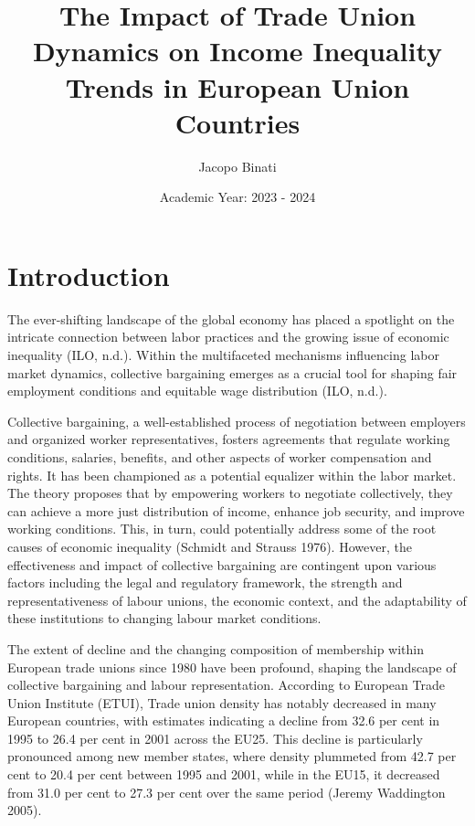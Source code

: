 \documentclass{article}
\begin{document}
\title{The Impact of Trade Union Dynamics on Income Inequality Trends in European Union Countries}
\author{Jacopo Binati}
\date{Academic Year: 2023 - 2024}
\maketitle
\section{Introduction}

The ever-shifting landscape of the global economy has placed a spotlight on the intricate connection between labor practices and the growing issue of economic inequality (ILO, n.d.). Within the multifaceted mechanisms influencing labor market dynamics, collective bargaining emerges as a crucial tool for shaping fair employment conditions and equitable wage distribution (ILO, n.d.). 

Collective bargaining, a well-established process of negotiation between employers and organized worker representatives, fosters agreements that regulate working conditions, salaries, benefits, and other aspects of worker compensation and rights. It has been championed as a potential equalizer within the labor market. The theory proposes that by empowering workers to negotiate collectively, they can achieve a more just distribution of income, enhance job security, and improve working conditions. This, in turn, could potentially address some of the root causes of economic inequality (Schmidt and Strauss 1976). However, the effectiveness and impact of collective bargaining are contingent upon various factors including the legal and regulatory framework, the strength and representativeness of labour unions, the economic context, and the adaptability of these institutions to changing labour market conditions. 

The extent of decline and the changing composition of membership within European trade unions since 1980 have been profound, shaping the landscape of collective bargaining and labour representation. According to European Trade Union Institute (ETUI), Trade union density has notably decreased in many European countries, with estimates indicating a decline from 32.6 per cent in 1995 to 26.4 per cent in 2001 across the EU25. This decline is particularly pronounced among new member states, where density plummeted from 42.7 per cent to 20.4 per cent between 1995 and 2001, while in the EU15, it decreased from 31.0 per cent to 27.3 per cent over the same period (Jeremy Waddington 2005).
\end{document}
